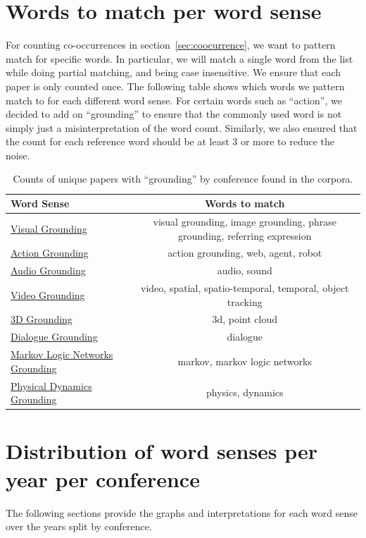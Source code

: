 \documentclass[11pt]{article}
\begin{document}
\section{Words to match per word sense}
\label{sec:appendix_word_matching}

For counting co-occurrences in section~\ref{sec:coocurrence}, we want to pattern match for specific words. In particular, we will match a single word from the list while doing partial matching, and being case insensitive. We ensure that each paper is only counted once. The following table shows which words we pattern match to for each different word sense. For certain words such as ``action'', we decided to add on ``grounding'' to ensure that the commonly used word is not simply just a misinterpretation of the word count. Similarly, we also ensured that the count for each reference word should be at least 3 or more to reduce the noise.

\begin{table}[h!]
  \centering
  \begin{tabular}{lc}
    \hline
    \textbf{Word Sense} & \textbf{Words to match} \\
    \hline
    {\hyperref[sec:visual]{Visual Grounding}}     & {visual grounding, image grounding, phrase grounding, referring expression}           \\
    {\hyperref[sec:action]{Action Grounding}}     & {action grounding, web, agent, robot}           \\
    {\hyperref[sec:audio]{Audio Grounding}}     & {audio, sound}           \\
    {\hyperref[sec:video]{Video Grounding}}     & {video, spatial, spatio-temporal, temporal, object tracking}           \\
    {\hyperref[sec:3d]{3D Grounding}}     & {3d, point cloud}           \\
    {\hyperref[sec:dialogue]{Dialogue Grounding}}     & {dialogue}           \\
    {\hyperref[sec:markov]{Markov Logic Networks Grounding}}     & {markov, markov logic networks}           \\
    {\hyperref[sec:dynamics]{Physical Dynamics Grounding}}     & {physics, dynamics}           \\\hline
  \end{tabular}
  \caption{Counts of unique papers with ``grounding'' by conference found in the corpora.}
  \label{tab:word_senses}
\end{table}
\section{Distribution of word senses per year per conference}
\label{sec:appendix_word_sense_years}
The following sections provide the graphs and interpretations for each word sense over the years split by conference.
\end{document}
